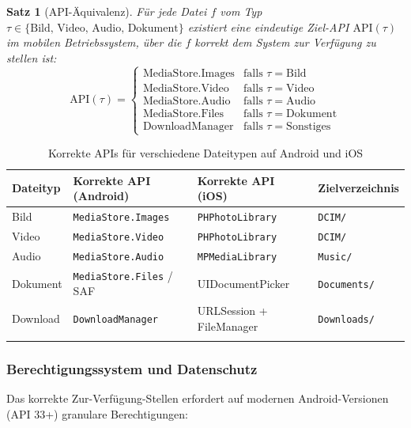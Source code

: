 ﻿\documentclass[12pt, a4paper]{article}
\newtheorem{satz}[definition]{Satz}
\begin{document}
\begin{satz}[API-Äquivalenz]
\label{satz:api}
Für jede Datei $f$ vom Typ $\tau \in \{\text{Bild, Video, Audio, Dokument}\}$
existiert eine eindeutige Ziel-API $\text{API}(\tau)$ im mobilen Betriebssystem,
über die $f$ korrekt dem System zur Verfügung zu stellen ist:
\[
  \text{API}(\tau) = \begin{cases}
    \text{MediaStore.Images} & \text{falls } \tau = \text{Bild} \\
    \text{MediaStore.Video}  & \text{falls } \tau = \text{Video} \\
    \text{MediaStore.Audio}  & \text{falls } \tau = \text{Audio} \\
    \text{MediaStore.Files}  & \text{falls } \tau = \text{Dokument} \\
    \text{DownloadManager}   & \text{falls } \tau = \text{Sonstiges}
  \end{cases}
\]
\end{satz}

\begin{longtable}{@{}p{2.5cm} p{3.5cm} p{3.5cm} p{3cm}@{}}
\toprule
\textbf{Dateityp} & \textbf{Korrekte API (Android)} & \textbf{Korrekte API (iOS)} & \textbf{Zielverzeichnis} \\
\midrule
\endhead
Bild & \texttt{MediaStore.Images} & \texttt{PHPhotoLibrary} & \texttt{DCIM/} \\
Video & \texttt{MediaStore.Video} & \texttt{PHPhotoLibrary} & \texttt{DCIM/} \\
Audio & \texttt{MediaStore.Audio} & \texttt{MPMediaLibrary} & \texttt{Music/} \\
Dokument & \texttt{MediaStore.Files} / SAF & UIDocumentPicker & \texttt{Documents/} \\
Download & \texttt{DownloadManager} & URLSession + FileManager & \texttt{Downloads/} \\
\bottomrule
\caption{Korrekte APIs für verschiedene Dateitypen auf Android und iOS}
\label{tab:apis}
\end{longtable}

\subsubsection{Berechtigungssystem und Datenschutz}

Das korrekte Zur-Verfügung-Stellen erfordert auf modernen Android-Versionen
(API 33+) granulare Berechtigungen:
\end{document}
